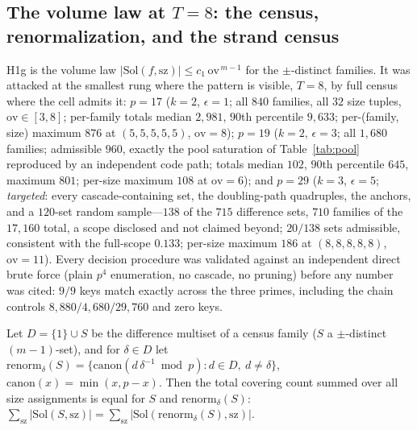 \subsection{The volume law at \texorpdfstring{$T=8$}{T=8}: the census, renormalization, and the strand census}\label{sec:scale-h1}

H1g is the volume law
$|\mathrm{Sol}(f,\mathrm{sz})|\le c_1\,\mathrm{ov}^{\,m-1}$ for the
$\pm$-distinct families. It was attacked at the smallest rung where the
pattern is visible, $T=8$, by full census where the cell admits it:
$p=17$ ($k=2$, $\epsilon=1$; all $840$ families, all $32$ size tuples,
$\mathrm{ov}\in[3,8]$; per-family totals median $2{,}981$, $90$th
percentile $9{,}633$; per-(family, size) maximum $876$ at
$(5,5,5,5,5)$, $\mathrm{ov}=8$); $p=19$ ($k=2$, $\epsilon=3$; all
$1{,}680$ families; admissible $960$, exactly the pool saturation of
Table~\ref{tab:pool} reproduced by an independent code path; totals
median $102$, $90$th percentile $645$, maximum $801$; per-size maximum
$108$ at $\mathrm{ov}=6$); and $p=29$ ($k=3$, $\epsilon=5$;
\emph{targeted}: every cascade-containing set, the doubling-path
quadruples, the anchors, and a $120$-set random sample---$138$ of the
$715$ difference sets, $710$ families of the $17{,}160$ total, a scope
disclosed and not claimed beyond; $20/138$ sets admissible, consistent
with the full-scope $0.133$; per-size maximum $186$ at
$(8,8,8,8,8)$, $\mathrm{ov}=11$). Every decision procedure was
validated against an independent direct brute force (plain $p^4$
enumeration, no cascade, no pruning) before any number was cited:
$9/9$ keys match exactly across the three primes, including the chain
controls $8{,}880/4{,}680/29{,}760$ and zero keys.

\begin{lemma}\label{lem:renorm}
Let $D=\{1\}\cup S$ be the difference multiset of a census family ($S$
a $\pm$-distinct $(m-1)$-set), and for $\delta\in D$ let
$\mathrm{renorm}_\delta(S)=\{\mathrm{canon}(d\,\delta^{-1}\bmod p):
d\in D,\ d\ne\delta\}$, $\mathrm{canon}(x)=\min(x,p-x)$. Then the total
covering count summed over all size assignments is equal for $S$ and
$\mathrm{renorm}_\delta(S)$:
$\sum_{\mathrm{sz}}|\mathrm{Sol}(S,\mathrm{sz})|
=\sum_{\mathrm{sz}}|\mathrm{Sol}(\mathrm{renorm}_\delta(S),
\mathrm{sz})|$.
\end{lemma}

